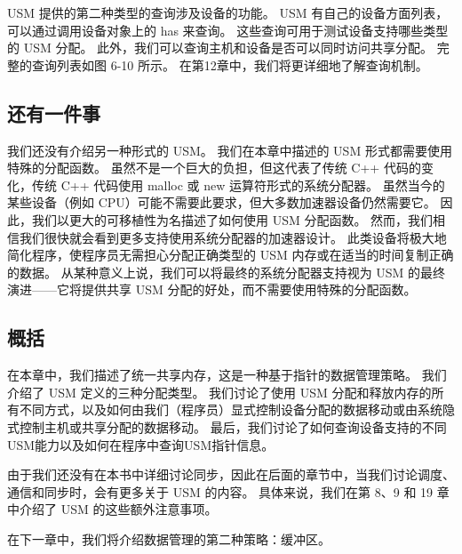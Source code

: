 USM 提供的第二种类型的查询涉及设备的功能。 USM 有自己的设备方面列表，可以通过调用设备对象上的 has 来查询。 这些查询可用于测试设备支持哪些类型的 USM 分配。 此外，我们可以查询主机和设备是否可以同时访问共享分配。 完整的查询列表如图 6-10 所示。 在第12章中，我们将更详细地了解查询机制。

\subsection{还有一件事}
我们还没有介绍另一种形式的 USM。 我们在本章中描述的 USM 形式都需要使用特殊的分配函数。 虽然不是一个巨大的负担，但这代表了传统 C++ 代码的变化，传统 C++ 代码使用 malloc 或 new 运算符形式的系统分配器。 虽然当今的某些设备（例如 CPU）可能不需要此要求，但大多数加速器设备仍然需要它。 因此，我们以更大的可移植性为名描述了如何使用 USM 分配函数。 然而，我们相信我们很快就会看到更多支持使用系统分配器的加速器设计。 此类设备将极大地简化程序，使程序员无需担心分配正确类型的 USM 内存或在适当的时间复制正确的数据。 从某种意义上说，我们可以将最终的系统分配器支持视为 USM 的最终演进——它将提供共享 USM 分配的好处，而不需要使用特殊的分配函数。

\subsection{概括}
在本章中，我们描述了统一共享内存，这是一种基于指针的数据管理策略。 我们介绍了 USM 定义的三种分配类型。 我们讨论了使用 USM 分配和释放内存的所有不同方式，以及如何由我们（程序员）显式控制设备分配的数据移动或由系统隐式控制主机或共享分配的数据移动。 最后，我们讨论了如何查询设备支持的不同USM能力以及如何在程序中查询USM指针信息。

由于我们还没有在本书中详细讨论同步，因此在后面的章节中，当我们讨论调度、通信和同步时，会有更多关于 USM 的内容。 具体来说，我们在第 8、9 和 19 章中介绍了 USM 的这些额外注意事项。

在下一章中，我们将介绍数据管理的第二种策略：缓冲区。
